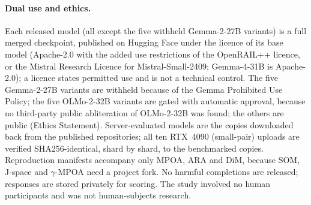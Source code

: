 \paragraph{Dual use and ethics.}
Each released model (all except the five withheld Gemma-2-27B variants) is a
full merged checkpoint, published on Hugging Face under
the licence of its base model (Apache-2.0 with the added use restrictions of
the OpenRAIL++ licence, or the
Mistral Research Licence for Mistral-Small-2409; Gemma-4-31B is
Apache-2.0); a licence states permitted use and is not a
technical control. The five Gemma-2-27B variants are withheld because of the
Gemma Prohibited Use Policy; the five OLMo-2-32B variants are gated with
automatic approval, because no third-party public abliteration of OLMo-2-32B
was found; the others are public (Ethics Statement). Server-evaluated models are the copies downloaded back
from the published repositories; all ten RTX~4090 (small-pair) uploads are
verified SHA256-identical, shard by shard, to the benchmarked copies.
Reproduction manifests accompany only MPOA, ARA and DiM,
because SOM, J-space and $\gamma$-MPOA need a project fork. No harmful completions are
released; responses are stored privately for scoring. The study involved no
human participants and was not human-subjects research.

